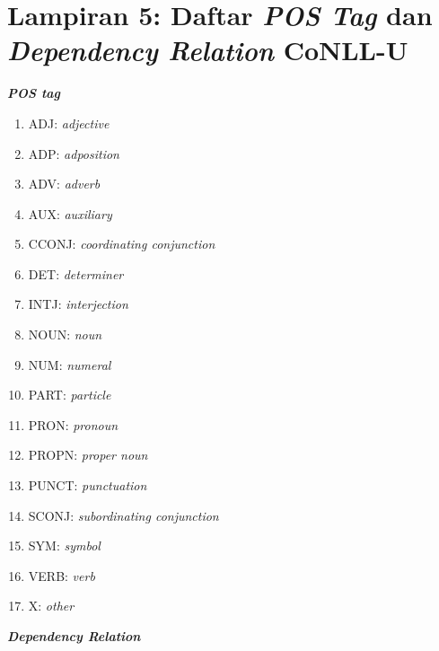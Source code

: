 
\chapter*{Lampiran 5: Daftar \textit{POS Tag} dan \textit{Dependency Relation} CoNLL-U}

\textbf{\textit{POS tag}}

\begin{multicols}{2}
	\begin{enumerate}
		\item ADJ: \textit{adjective}
		\item ADP: \textit{adposition}
		\item ADV: \textit{adverb}
		\item AUX: \textit{auxiliary}
		\item CCONJ: \textit{coordinating conjunction}
		\item DET: \textit{determiner}
		\item INTJ: \textit{interjection}
		\item NOUN: \textit{noun}
		\item NUM: \textit{numeral}
		\item PART: \textit{particle}
		\item PRON: \textit{pronoun}
		\item PROPN: \textit{proper noun}
		\item PUNCT: \textit{punctuation}
		\item SCONJ: \textit{subordinating conjunction}
		\item SYM: \textit{symbol}
		\item VERB: \textit{verb}
		\item X: \textit{other}
	\end{enumerate}
\end{multicols}

\noindent\textbf{\textit{Dependency Relation}}

